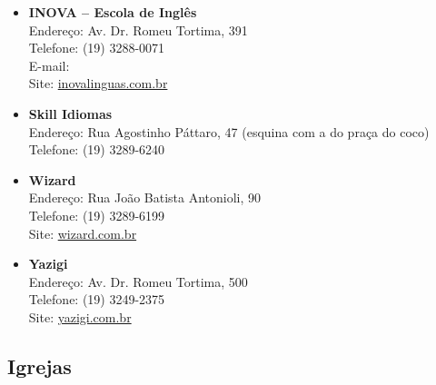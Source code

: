 \begin{itemize}
    \item   \textbf{INOVA -- Escola de Inglês}
        \\Endereço: Av. Dr. Romeu Tortima, 391
        \\Telefone: (19) 3288-0071
        \\E-mail: 
        \\Site: \url{inovalinguas.com.br}

    \item   \textbf{Skill Idiomas}
        \\Endereço: Rua Agostinho Páttaro, 47 (esquina com a do praça do coco)
        \\Telefone: (19) 3289-6240

    \item   \textbf{Wizard}
        \\Endereço: Rua João Batista Antonioli, 90
        \\Telefone: (19) 3289-6199
        \\Site: \url{wizard.com.br}

    \item   \textbf{Yazigi}
        \\Endereço: Av. Dr. Romeu Tortima, 500
        \\Telefone: (19) 3249-2375
        \\Site: \url{yazigi.com.br}
\end{itemize}

\subsection{Igrejas}

